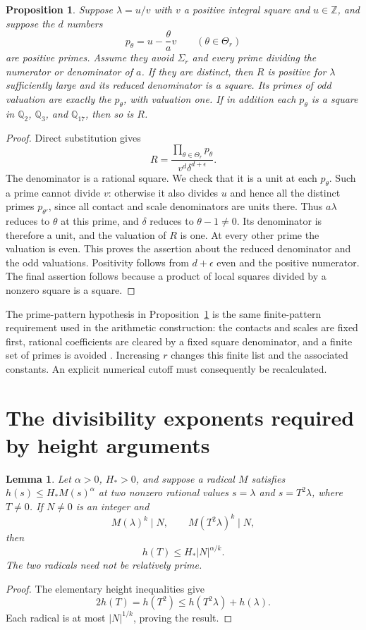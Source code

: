 \documentclass[11pt,a4paper]{article}
\newtheorem{proposition}[theorem]{Proposition}
\newtheorem{lemma}[theorem]{Lemma}
\theoremstyle{definition}\newtheorem{definition}[theorem]{Definition}
\newcommand{\Q}{\mathbb Q}\newcommand{\Z}{\mathbb Z}
\begin{document}
\begin{proposition}\label{prop:prime-pattern}
Suppose $\lambda=u/v$ with $v$ a positive integral square and
$u\in\Z$, and suppose the $d$ numbers
\[
 p_\theta=u-\frac{\theta}{a}v\qquad(\theta\in\Theta_r)
\]
are positive primes. Assume they avoid $\Sigma_r$ and every prime
dividing the numerator or denominator of $a$. If they are distinct,
then $R$ is positive for $\lambda$ sufficiently large and its
reduced denominator is a square. Its primes of odd valuation
are exactly the $p_\theta$, with valuation one. If in addition each
$p_\theta$ is a square in $\Q_2$, $\Q_3$, and $\Q_{17}$, then
so is $R$.
\end{proposition}
\begin{proof}
Direct substitution gives
\[
 R=\frac{\prod_{\theta\in\Theta_r}p_\theta}
          {v^d\delta^{d+\epsilon}}.
\]
The denominator is a rational square. We check that it is a unit at
each $p_\theta$. Such a prime cannot divide $v$: otherwise it also
divides $u$ and hence all the distinct primes $p_{\theta'}$, since
all contact and scale denominators are units there. Thus $a\lambda$
reduces to $\theta$ at this prime, and $\delta$ reduces to
$\theta-1\ne0$. Its denominator is therefore a unit, and the
valuation of $R$ is one. At every other prime the valuation is even.
This proves the assertion about the reduced denominator and the odd
valuations. Positivity follows from $d+\epsilon$ even and the
positive numerator. The final assertion follows because a product
of local squares divided by a nonzero square is a square.
\end{proof}

The prime-pattern hypothesis in Proposition~\ref{prop:prime-pattern}
is the same finite-pattern requirement used in the arithmetic
construction: the contacts and scales are fixed first, rational
coefficients are cleared by a fixed square denominator, and a
finite set of primes is avoided \cite{Sun,Arithmetic}.
Increasing $r$ changes this finite list and the associated constants.
An explicit numerical cutoff must consequently be recalculated.

\section{The divisibility exponents required by height arguments}

\begin{lemma}\label{lem:two-scales}
Let $\alpha>0$, $H_*>0$, and suppose a radical $M$ satisfies
$h(s)\le H_*M(s)^\alpha$ at two nonzero rational values
$s=\lambda$ and $s=T^2\lambda$, where $T\ne0$.
If $N\ne0$ is an integer and
\[
 M(\lambda)^k\mid N,\qquad M(T^2\lambda)^k\mid N,
\]
then
\[
 h(T)\le H_*|N|^{\alpha/k}.
\]
The two radicals need not be relatively prime.
\end{lemma}
\begin{proof}
The elementary height inequalities give
\[
 2h(T)=h(T^2)\le h(T^2\lambda)+h(\lambda).
\]
Each radical is at most $|N|^{1/k}$, proving the result.
\end{proof}
\end{document}
